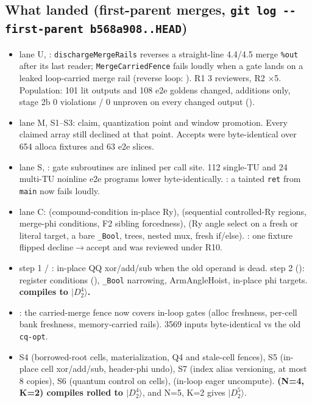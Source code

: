 \subsection*{What landed (first-parent merges, \texttt{git log -{}-first-parent b568a908..HEAD})}
\begin{itemize}[itemsep=1pt]
\item {} lane U, : \texttt{dischargeMergeRails} reverses a straight-line 4.4/4.5 merge \texttt{\%out} after its last reader; \texttt{MergeCarriedFence} fails loudly when a gate lands on a leaked loop-carried merge rail (reverse loop: ). R1 3 reviewers, R2 $\times$5. Population: 101 lit outputs and 108 e2e goldens changed, additions only, stage 2b 0 violations / 0 unproven on every changed output ().
\item {} lane M,  S1--S3: claim, quantization point and window promotion. Every claimed array still declined at that point. Accepts were byte-identical over 654 alloca fixtures and 63 e2e slices.
\item {} lane S, : gate subroutines are inlined per call site. 112 single-TU and 24 multi-TU noinline e2e programs lower byte-identically. : a tainted \texttt{ret} from \texttt{main} now fails loudly.
\item {} lane C:  (compound-condition in-place Ry),  (sequential controlled-Ry regions, merge-phi conditions, F2 sibling forcedness),  (Ry angle select on a fresh or literal target, a bare \texttt{\_Bool}, trees, nested mux, fresh if/else). : one fixture flipped decline$\to$accept and was reviewed under R10.
\item {}  step 1 / : in-place QQ xor/add/sub when the old operand is dead.  step 2 (): register conditions (), \texttt{\_Bool} narrowing, ArmAngleHoist, in-place phi targets. \textbf{ compiles to $|D^4_2\rangle$.}
\item {} : the carried-merge fence now covers in-loop gates (alloc freshness, per-cell bank freshness, memory-carried rails). 3569 inputs byte-identical vs the old \texttt{cq-opt}.
\item {} S4 (borrowed-root cells, materialization, Q4 and stale-cell fences),  S5 (in-place cell xor/add/sub, header-phi undo),  S7 (index alias versioning, at most 8 copies),  S6 (quantum control on cells),   (in-loop eager uncompute). \textbf{ (N=4, K=2) compiles rolled to $|D^4_2\rangle$}, and N=5, K=2 gives $|D^5_2\rangle$.

\end{itemize}
